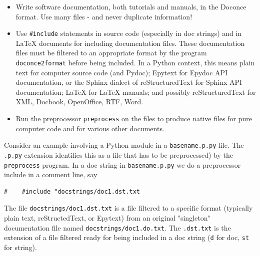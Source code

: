 \documentclass{article}
\begin{document}
\begin{itemize}
   \item Write software documentation, both tutorials and manuals, in
     the Doconce format. Use many files - and never duplicate information!
   \item Use {\fontsize{10pt}{10pt}\verb!#include!} statements in source code (especially in doc
     strings) and in {\LaTeX} documents for including documentation
     files.  These documentation files must be filtered to an
     appropriate format by the program {\fontsize{10pt}{10pt}\verb!doconce2format!} before being
     included. In a Python context, this means plain text for computer
     source code (and Pydoc); Epytext for Epydoc API documentation, or
     the Sphinx dialect of reStructuredText for Sphinx API
     documentation; {\LaTeX} for {\LaTeX} manuals; and possibly
     reStructuredText for XML, Docbook, OpenOffice, RTF, Word.
   \item Run the preprocessor {\fontsize{10pt}{10pt}\verb!preprocess!} on the files to produce native
     files for pure computer code and for various other documents.
\end{itemize}
Consider an example involving a Python module in a {\fontsize{10pt}{10pt}\verb!basename.p.py!} file.
The {\fontsize{10pt}{10pt}\verb!.p.py!} extension identifies this as a file that has to be
preprocessed) by the {\fontsize{10pt}{10pt}\verb!preprocess!} program. 
In a doc string in {\fontsize{10pt}{10pt}\verb!basename.p.py!} we do a preprocessor include
in a comment line, say
\begin{Verbatim}[fontsize=\fontsize{9pt}{9pt},tabsize=8,baselinestretch=0.85,
fontfamily=tt,xleftmargin=7mm]
#    #include "docstrings/doc1.dst.txt
\end{Verbatim}
\noindent
% 
% 
The file {\fontsize{10pt}{10pt}\verb!docstrings/doc1.dst.txt!} is a file filtered to a specific format
(typically plain text, reStructedText, or Epytext) from an original
"singleton" documentation file named {\fontsize{10pt}{10pt}\verb!docstrings/doc1.do.txt!}. The {\fontsize{10pt}{10pt}\verb!.dst.txt!}
is the extension of a file filtered ready for being included in a doc
string ({\fontsize{10pt}{10pt}\verb!d!} for doc, {\fontsize{10pt}{10pt}\verb!st!} for string).
\end{document}
